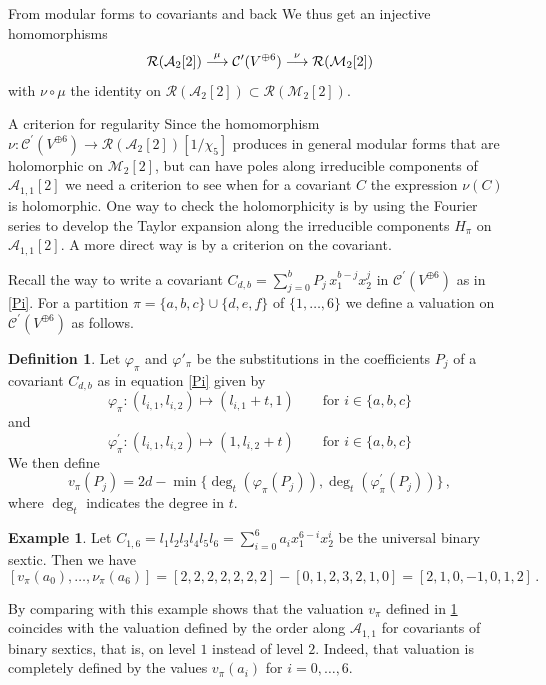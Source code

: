 \documentclass[12pt]{amsart}
\numberwithin{equation}{section}
\newcommand\langepijl[1]{\buildrel {#1} \over \longrightarrow}
\numberwithin{equation}{section}
\theoremstyle{definition}
\newtheorem{definition}[theorem]{Definition}
\newtheorem{example}[theorem]{Example}
\theoremstyle{remark}
\begin{document}
\begin{section}{From modular forms to covariants and back}
We thus get an injective homomorphisms
$$
\mathcal{R}(\mathcal{A}_2[2]) \langepijl{\mu} \mathcal{C}^{\prime}(V^{\oplus 6})\langepijl{\nu} \mathcal{R}(\mathcal{M}_2[2])
$$
with $\nu\circ \mu$ the identity on $\mathcal{R}(\mathcal{A}_2[2]) \subset \mathcal{R}(\mathcal{M}_2[2])$.

\end{section}
\begin{section}{A criterion for regularity}
Since the homomorphism $\nu:\mathcal{C}^{\prime}(V^{\oplus 6})\to \mathcal{R}(\mathcal{A}_2[2])[1/\chi_5]$
produces in general modular forms that are holomorphic on $\mathcal{M}_2[2]$, but can have poles along 
irreducible components of $\mathcal{A}_{1,1}[2]$ we need a criterion to see when for a covariant $C$ the 
expression $\nu(C)$
is holomorphic. One way to check the holomorphicity is by using the Fourier series to develop the
Taylor expansion along the irreducible components $H_{\pi}$ on  $\mathcal{A}_{1,1}[2]$. A more direct way is by a criterion on the
covariant.

Recall the way to write a covariant $C_{d,b}= \sum_{j=0}^b P_j \, x_1^{b-j}x_2^j$ in $\mathcal{C}^{\prime}(V^{\oplus 6})$ as in \ref{Pi}.
For a partition $\pi=\{a,b,c\}\cup \{d,e,f\}$ of $\{1,\ldots,6\}$ we define a valuation on $\mathcal{C}^{\prime}(V^{\oplus 6})$
as follows.

\begin{definition}\label{defv}
Let $\varphi_{\pi}$ and $\varphi'_{\pi}$ be the substitutions in the 
coefficients $P_j$ of a covariant $C_{d,b}$ as in equation \ref{Pi}
given by
$$
\varphi_{\pi}: (l_{i,1},l_{i,2}) \mapsto (l_{i,1}+t,1) \qquad \text{for $i \in \{a,b,c\}$}
$$
and
$$
\varphi_{\pi}^{\prime}: (l_{i,1},l_{i,2}) \mapsto (1,l_{i,2}+t) \qquad \text{for $i \in \{a,b,c\}$}
$$
We then define 
$$
v_{\pi}(P_j)= 2d-\min \{\deg_t(\varphi_{\pi}(P_j)), \deg_t(\varphi_{\pi}^{\prime}(P_j))\}\, ,
$$
where $\deg_t$ indicates the degree in $t$.
\end{definition}

\begin{example} \label{exampleC16}
Let $C_{1,6}=l_1l_2l_3l_4l_5l_6=\sum_{i=0}^6a_ix_1^{6-i}x_2^i$ be the universal binary sextic. Then we have 
$$
[v_{\pi}(a_0),\ldots,\nu_{\pi}(a_6)]=[2,2,2,2,2,2,2]-[0,1,2,3,2,1,0]=[2,1,0,-1,0,1,2] \, .
$$
\end{example}
By comparing with \cite{CFG1,CFG2} this example shows that the valuation $v_{\pi}$ 
defined in \ref{defv} coincides with the valuation defined by the order
along $\mathcal{A}_{1,1}$ for covariants of binary sextics, that is, 
on level $1$ instead of level $2$. Indeed, that valuation is completely defined by
the values $v_{\pi}(a_i)$ for $i=0,\ldots,6$.


\end{section}
\end{document}
